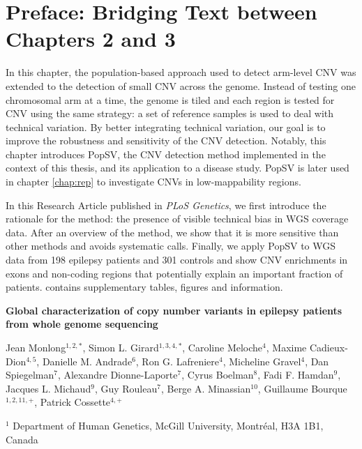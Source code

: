 \section*{Preface: Bridging Text between Chapters 2 and 3}


In this chapter, the population-based approach used to detect arm-level CNV was extended to the detection of small CNV across the genome.
Instead of testing one chromosomal arm at a time, the genome is tiled and each region is tested for CNV using the same strategy: a set of reference samples is used to deal with technical variation.
By better integrating technical variation, our goal is to improve the robustness and sensitivity of the CNV detection.
Notably, this chapter introduces {\sf PopSV}, the CNV detection method implemented in the context of this thesis, and its application to a disease study.
{\sf PopSV} is later used in chapter \ref{chap:rep} to investigate CNVs in low-mappability regions.

In this Research Article published in {\it PLoS Genetics}\cite{Monlong2018}, we first introduce the rationale for the method: the presence of visible technical bias in WGS coverage data.
After an overview of the method, we show that it is more sensitive than other methods and avoids systematic calls.
Finally, we apply {\sf PopSV} to WGS data from 198 epilepsy patients and 301 controls and show CNV enrichments in exons and non-coding regions that potentially explain an important fraction of patients.
 contains supplementary tables, figures and information.
\bigskip

\newpage
\singlespacing

\begin{center}
  \LARGE\bf Global characterization of copy number variants in epilepsy patients from whole genome sequencing
\end{center}
\bigskip

\large{Jean Monlong$^{1,2,*}$, Simon L. Girard$^{1,3,4,*}$, Caroline Meloche$^{4}$, Maxime Cadieux-Dion$^{4,5}$, Danielle M. Andrade$^{6}$, Ron G. Lafreniere$^{4}$, Micheline Gravel$^{4}$, Dan Spiegelman$^{7}$, Alexandre Dionne-Laporte$^{7}$, Cyrus Boelman$^{8}$, Fadi F. Hamdan$^{9}$, Jacques L. Michaud$^{9}$, Guy Rouleau$^{7}$, Berge A. Minassian$^{10}$, Guillaume Bourque$^{1,2,11,+}$, Patrick Cossette$^{4,+}$}
\bigskip

\footnotesize
$^{1}$ Department of Human Genetics, McGill University, Montr\'eal, H3A 1B1, Canada

